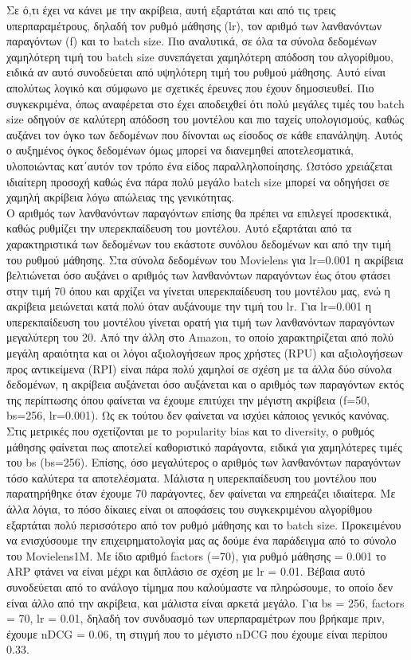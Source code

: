 \noindent Σε ό,τι έχει να κάνει με την ακρίβεια, αυτή εξαρτάται και από τις τρεις υπερπαραμέτρους, δηλαδή τον ρυθμό μάθησης (lr), τον αριθμό των λανθανόντων παραγόντων (f) και το batch size. Πιο αναλυτικά, σε όλα τα σύνολα δεδομένων χαμηλότερη τιμή του batch size συνεπάγεται χαμηλότερη απόδοση του αλγορίθμου, ειδικά αν αυτό συνοδεύεται από υψηλότερη τιμή του ρυθμού μάθησης. Αυτό είναι απολύτως λογικό και σύμφωνο με σχετικές έρευνες που έχουν δημοσιευθεί. Πιο συγκεκριμένα, όπως αναφέρεται στο \cite{keskarLargebatchTrainingDeep2017} έχει αποδειχθεί ότι πολύ μεγάλες τιμές του batch size οδηγούν σε καλύτερη απόδοση του μοντέλου και πιο ταχείς υπολογισμούς, καθώς αυξάνει τον όγκο των δεδομένων που δίνονται ως είσοδος σε κάθε επανάληψη. Αυτός ο αυξημένος όγκος δεδομένων όμως μπορεί να διανεμηθεί αποτελεσματικά, υλοποιώντας κατ΄αυτόν τον τρόπο ένα είδος παραλληλοποίησης. Ωστόσο χρειάζεται ιδιαίτερη προσοχή καθώς ένα πάρα πολύ μεγάλο batch size μπορεί να οδηγήσει σε χαμηλή ακρίβεια λόγω απώλειας της γενικότητας. \\  Ο αριθμός των λανθανόντων παραγόντων επίσης θα πρέπει να επιλεγεί προσεκτικά, καθώς ρυθμίζει την υπερεκπαίδευση του μοντέλου. Αυτό εξαρτάται από τα χαρακτηριστικά των δεδομένων του εκάστοτε συνόλου δεδομένων και από την τιμή του ρυθμού μάθησης. Στα σύνολα δεδομένων του Movielens για lr=0.001 η ακρίβεια βελτιώνεται όσο αυξάνει ο αριθμός των λανθανόντων παραγόντων έως ότου φτάσει στην τιμή 70 όπου και αρχίζει να γίνεται υπερεκπαίδευση του μοντέλου μας, ενώ η ακρίβεια μειώνεται κατά πολύ όταν αυξάνουμε την τιμή του lr. Για lr=0.001 η υπερεκπαίδευση του μοντέλου γίνεται ορατή για τιμή των λανθανόντων παραγόντων μεγαλύτερη του 20. Από την άλλη στο Amazon, το οποίο χαρακτηρίζεται από πολύ μεγάλη αραιότητα και οι λόγοι αξιολογήσεων προς χρήστες (RPU) και αξιολογήσεων προς αντικείμενα (RPI) είναι πάρα πολύ χαμηλοί σε σχέση με τα άλλα δύο σύνολα δεδομένων, η ακρίβεια αυξάνεται όσο αυξάνεται και ο αριθμός των παραγόντων εκτός της περίπτωσης όπου φαίνεται να έχουμε επιτύχει την μέγιστη ακρίβεια (f=50, bs=256, lr=0.001). Ως εκ τούτου δεν φαίνεται να ισχύει κάποιος γενικός κανόνας.\\
\noindent Στις μετρικές που σχετίζονται με το popularity bias και το diversity, ο ρυθμός μάθησης φαίνεται πως αποτελεί καθοριστικό παράγοντα, ειδικά για χαμηλότερες τιμές του bs (bs=256). Επίσης, όσο μεγαλύτερος ο αριθμός των λανθανόντων παραγόντων τόσο καλύτερα τα αποτελέσματα. Μάλιστα η υπερεκπαίδευση του μοντέλου που παρατηρήθηκε όταν έχουμε 70 παράγοντες, δεν φαίνεται να επηρεάζει ιδιαίτερα. Με άλλα λόγια, το πόσο δίκαιες είναι οι αποφάσεις του συγκεκριμένου αλγορίθμου εξαρτάται πολύ περισσότερο από τον ρυθμό μάθησης και το batch size. Προκειμένου να ενισχύσουμε την επιχειρηματολογία μας ας δούμε ένα παράδειγμα από το σύνολο του Movielens1M. Με ίδιο αριθμό factors (=70), για ρυθμό μάθησης = 0.001 το ARP φτάνει να είναι μέχρι και διπλάσιο σε σχέση με lr = 0.01. Βέβαια αυτό συνοδεύεται από το ανάλογο τίμημα που καλούμαστε να πληρώσουμε, το οποίο δεν είναι άλλο από την ακρίβεια, και μάλιστα είναι αρκετά μεγάλο. Για bs = 256, factors = 70, lr = 0.01, δηλαδή τον συνδυασμό των υπερπαραμέτρων που βρήκαμε πριν, έχουμε nDCG = 0.06, τη στιγμή που το μέγιστο nDCG που έχουμε είναι περίπου 0.33. \\
